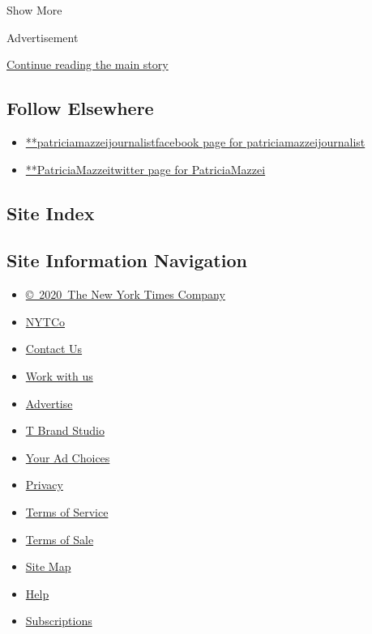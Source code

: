 Show More

Advertisement

\protect\hyperlink{after-mid2}{Continue reading the main story}

\hypertarget{follow-elsewhere}{%
\subsection{Follow Elsewhere}\label{follow-elsewhere}}

\begin{itemize}
\tightlist
\item
  \href{https://www.facebook.com/patriciamazzeijournalist}{**patriciamazzeijournalistfacebook
  page for patriciamazzeijournalist}
\item
  \href{https://twitter.com/PatriciaMazzei}{**PatriciaMazzeitwitter page
  for PatriciaMazzei}
\end{itemize}

\hypertarget{site-index}{%
\subsection{Site Index}\label{site-index}}

\hypertarget{site-information-navigation}{%
\subsection{Site Information
Navigation}\label{site-information-navigation}}

\begin{itemize}
\tightlist
\item
  \href{https://help.nytimes.com/hc/en-us/articles/115014792127-Copyright-notice}{©~2020~The
  New York Times Company}
\end{itemize}

\begin{itemize}
\tightlist
\item
  \href{https://www.nytco.com/}{NYTCo}
\item
  \href{https://help.nytimes.com/hc/en-us/articles/115015385887-Contact-Us}{Contact
  Us}
\item
  \href{https://www.nytco.com/careers/}{Work with us}
\item
  \href{https://nytmediakit.com/}{Advertise}
\item
  \href{http://www.tbrandstudio.com/}{T Brand Studio}
\item
  \href{https://www.nytimes.com/privacy/cookie-policy\#how-do-i-manage-trackers}{Your
  Ad Choices}
\item
  \href{https://www.nytimes.com/privacy}{Privacy}
\item
  \href{https://help.nytimes.com/hc/en-us/articles/115014893428-Terms-of-service}{Terms
  of Service}
\item
  \href{https://help.nytimes.com/hc/en-us/articles/115014893968-Terms-of-sale}{Terms
  of Sale}
\item
  \href{https://spiderbites.nytimes.com}{Site Map}
\item
  \href{https://help.nytimes.com/hc/en-us}{Help}
\item
  \href{https://www.nytimes.com/subscription?campaignId=37WXW}{Subscriptions}
\end{itemize}
